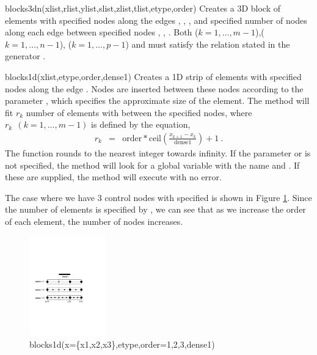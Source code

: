 \begin{codelist}
  \item[blocks3dn(xlist,rlist,ylist,slist,zlist,tlist,etype,order)]
    Creates a 3D block of elements with specified nodes
    along the edges 
    , 
    , 
    , and specified
    number of nodes along each edge between specified nodes
                   ,
                   ,
                   .
    Both ($k=1,\ldots,m-1$),($k=1,\ldots,n-1$),
         ($k=1,\ldots,p-1$) 
    and  must satisfy the relation stated in the generator 
    . 
\end{codelist}

\newpage
\begin{codelist}
  \item[blocks1d(xlist,etype,order,dense1)]
    Creates a 1D strip of elements with specified nodes
    along the edge . Nodes
    are inserted between these nodes according to the parameter
    , which specifies the approximate size of the
    element. The method will fit $r_k$ number of elements with
     between the specified nodes, where $r_k~~(k=1,\ldots,m-1)$ 
    is defined by the equation,
    \begin{eqnarray}
    r_k &=& \text{order} * \text{ceil}\left(\frac{x_{k+1}-x_k}
                                                 {\text{dense1}}\right)
                         + 1~. \nonumber
    \end{eqnarray} 
    The function  rounds to the nearest integer towards infinity.
    If the parameter  or  is not specified, the
    method will look for a global variable with the name  and
    . If these are supplied, the method will execute with no
    error.  

    The case where we have 3 control nodes with specified  
    is shown in Figure \ref{fig:Blocks1d}. Since the number of elements is
    specified by , we can see that as we increase the order of 
    each element, the number of nodes increases. 
    \begin{figure}[htbp]
    \centering
    \includegraphics[trim=0.0in 3.5in 2.0in 4.0in, clip, height=1.7in]{fig/blocks1d.pdf}
    \caption{blocks1d(x=\{x1,x2,x3\},etype,order=1,2,3,dense1)}
    \label{fig:Blocks1d}
    \end{figure}
\end{codelist}
